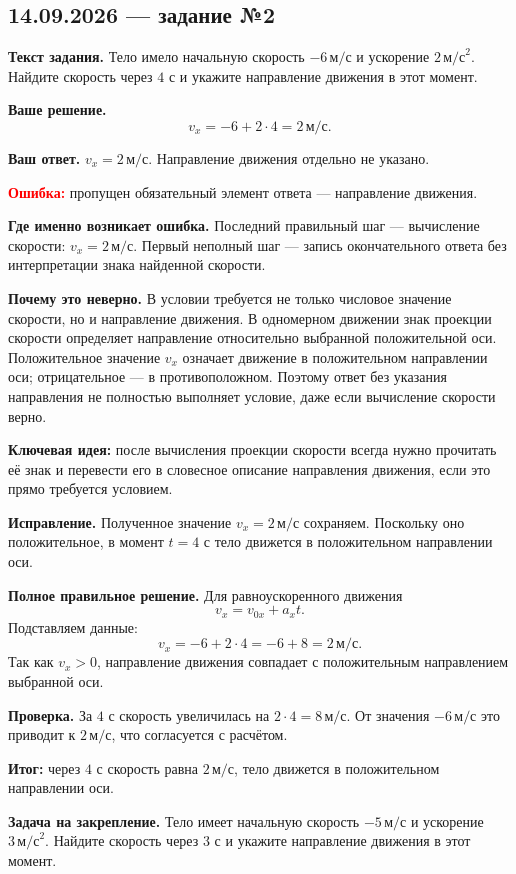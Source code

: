 \documentclass[12pt,a4paper]{article}
\newcommand{\taskhead}[1]{\subsection*{#1}}
\newcommand{\field}[1]{\textbf{#1}}
\begin{document}
\label{task:14-2}
\taskhead{14.09.2026 --- задание №2}

\field{Текст задания.} Тело имело начальную скорость $-6\,\text{м/с}$ и ускорение $2\,\text{м/с}^2$. Найдите скорость через $4$ с и укажите направление движения в этот момент.

\field{Ваше решение.}
\[
v_x=-6+2\cdot4=2\,\text{м/с}.
\]

\field{Ваш ответ.} $v_x=2\,\text{м/с}$. Направление движения отдельно не указано.

\textcolor{red}{\textbf{Ошибка:}} пропущен обязательный элемент ответа --- направление движения.

\field{Где именно возникает ошибка.} Последний правильный шаг --- вычисление скорости: $v_x=2\,\text{м/с}$. Первый неполный шаг --- запись окончательного ответа без интерпретации знака найденной скорости.

\field{Почему это неверно.} В условии требуется не только числовое значение скорости, но и направление движения. В одномерном движении знак проекции скорости определяет направление относительно выбранной положительной оси. Положительное значение $v_x$ означает движение в положительном направлении оси; отрицательное --- в противоположном. Поэтому ответ без указания направления не полностью выполняет условие, даже если вычисление скорости верно.

\textcolor{blue!60!black}{\textbf{Ключевая идея:}} после вычисления проекции скорости всегда нужно прочитать её знак и перевести его в словесное описание направления движения, если это прямо требуется условием.

\field{Исправление.} Полученное значение $v_x=2\,\text{м/с}$ сохраняем. Поскольку оно положительное, в момент $t=4$ с тело движется в положительном направлении оси.

\field{Полное правильное решение.} Для равноускоренного движения
\[
v_x=v_{0x}+a_xt.
\]
Подставляем данные:
\[
v_x=-6+2\cdot4=-6+8=2\,\text{м/с}.
\]
Так как $v_x>0$, направление движения совпадает с положительным направлением выбранной оси.

\field{Проверка.} За $4$ с скорость увеличилась на $2\cdot4=8\,\text{м/с}$. От значения $-6\,\text{м/с}$ это приводит к $2\,\text{м/с}$, что согласуется с расчётом.

\textcolor{teal!60!black}{\textbf{Итог:}} через $4$ с скорость равна $2\,\text{м/с}$, тело движется в положительном направлении оси.

\field{Задача на закрепление.} Тело имеет начальную скорость $-5\,\text{м/с}$ и ускорение $3\,\text{м/с}^2$. Найдите скорость через $3$ с и укажите направление движения в этот момент.
\end{document}
